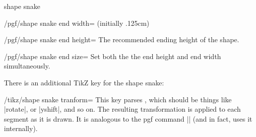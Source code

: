 \begin{snake}{shape snake}
\begin{key}{/pgf/shape snake end width= (initially .125cm)}
\end{key}%

\begin{key}{/pgf/shape snake end height=}
	The recommended ending height of the shape.
\end{key}%

\begin{stylekey}{/pgf/shape snake end size=}
	Set both the the end height and end width simultaneously.
\end{stylekey}

There is an additional TikZ key for the shape snake:

\begin{stylekey}{/tikz/shape snake tranform=}
	This key parses , which should be things like |rotate|, or
	|yshift|, and so on. The resulting transformation is applied to each 
	segment as it is drawn. It is analogous to the pgf command
	|\pgfsetsnakesegmenttransformation| (and in fact, uses it internally).

\begin{codeexample}[]
\end{codeexample}

\end{stylekey}

\end{snake}


